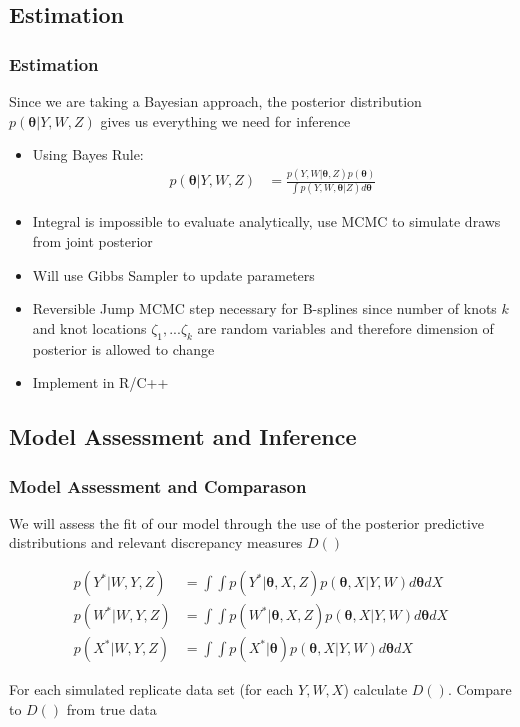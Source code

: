 \documentclass[handout]{beamer}\usepackage[]{graphicx}\usepackage[]{color}
\begin{document}
\subsection{Estimation}

\begin{frame}
\frametitle{Estimation}
Since we are taking a Bayesian approach, the posterior distribution $p(\boldsymbol{\theta}|Y,W,Z)$ gives us everything we need for inference

\begin{itemize}
\item
Using Bayes Rule: 
\begin{align}
p(\boldsymbol{\theta}|Y,W,Z) &= \frac{p(Y,W|\boldsymbol{\theta},Z) p(\boldsymbol{\theta})}{\int p(Y,W,\boldsymbol{\theta}|Z) d\boldsymbol{\theta}}
\end{align}
\item 
Integral is impossible to evaluate analytically, use MCMC to simulate draws from joint posterior
\item
Will use Gibbs Sampler to update parameters 
\item
Reversible Jump MCMC step necessary for B-splines since number of knots $k$ and knot locations $\zeta_1,...\zeta_k$ are random variables and therefore dimension of posterior is allowed to change
\item
Implement in R/C++
\end{itemize}

\end{frame}

\subsection{Model Assessment and Inference}

\begin{frame}
\frametitle{Model Assessment and Comparason}
We will assess the fit of our model through the use of the posterior predictive distributions and relevant discrepancy measures $D()$

\begin{align}
  p(Y^*|W,Y,Z) &= \int \int p(Y^*|\boldsymbol{\theta},X,Z) p(\boldsymbol{\theta}, X|Y,W) d\boldsymbol{\theta} dX \\
  p(W^*|W,Y,Z) &= \int \int p(W^*|\boldsymbol{\theta},X,Z) p(\boldsymbol{\theta}, X|Y,W) d\boldsymbol{\theta} dX \\
  p(X^*|W,Y,Z) &= \int \int p(X^*|\boldsymbol{\theta}) p(\boldsymbol{\theta}, X|Y,W) d\boldsymbol{\theta} dX
\end{align}

For each simulated replicate data set (for each $Y,W,X$) calculate $D()$. Compare to $D()$ from true data

\end{frame}
\end{document}
